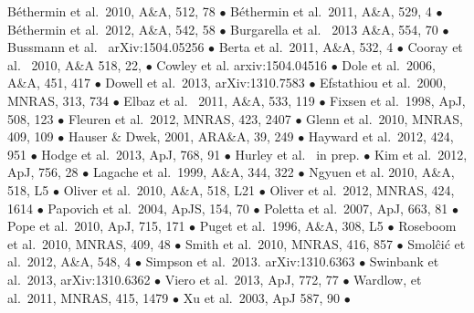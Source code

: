 \documentclass[12pt,a4paper]{article}
\begin{document}
B\'ethermin et al.\ 2010, A\&A, 512, 78 $\bullet$
B\'ethermin et al.\ 2011, A\&A, 529, 4 $\bullet$ 
B\'ethermin et al.\ 2012, A\&A, 542, 58 $\bullet$
Burgarella et al. \ 2013 A\&A, 554, 70 $\bullet$
Bussmann et al. \ arXiv:1504.05256 $\bullet$
Berta et al.\ 2011, A\&A, 532, 4 $\bullet$
Cooray et al. \ 2010, A\&A 518, 22, $\bullet$
Cowley et al. arxiv:1504.04516 $\bullet$
Dole et al.\ 2006, A\&A, 451, 417 $\bullet$
Dowell et al.\ 2013, arXiv:1310.7583 $\bullet$
Efstathiou et al.\ 2000, MNRAS, 313, 734 $\bullet$
Elbaz et al. \ 2011, A\&A, 533, 119 $\bullet$
Fixsen et al.\ 1998, ApJ, 508, 123 $\bullet$
Fleuren et al.\ 2012, MNRAS, 423, 2407 $\bullet$
Glenn et al.\ 2010, MNRAS, 409, 109 $\bullet$
Hauser \& Dwek, 2001, ARA\&A, 39, 249 $\bullet$
Hayward et al.\ 2012, 424, 951 $\bullet$
Hodge et al.\ 2013, ApJ, 768, 91 $\bullet$
Hurley et al. \ in prep. $\bullet$
Kim et al.\ 2012, ApJ, 756, 28 $\bullet$
Lagache et al.\ 1999, A\&A, 344, 322 $\bullet$
Ngyuen et al. 2010, A\&A, 518, L5 $\bullet$
Oliver et al.\ 2010, A\&A, 518, L21 $\bullet$
Oliver et al.\ 2012, MNRAS, 424, 1614 $\bullet$
Papovich et al.\ 2004, ApJS, 154, 70 $\bullet$
Poletta et al.\ 2007, ApJ, 663, 81 $\bullet$
Pope et al.\ 2010, ApJ, 715, 171 $\bullet$
Puget et al.\ 1996, A\&A, 308, L5 $\bullet$
Roseboom et al.\ 2010, MNRAS, 409, 48 $\bullet$
Smith et al.\ 2010, MNRAS, 416, 857 $\bullet$
Smol\^ci\'c et al.\ 2012, A\&A, 548, 4 $\bullet$
Simpson et al.\ 2013. arXiv:1310.6363 $\bullet$
Swinbank et al.\ 2013, arXiv:1310.6362 $\bullet$
Viero et al.\ 2013, ApJ, 772, 77 $\bullet$
Wardlow, et al.\ 2011, MNRAS, 415, 1479 $\bullet$
Xu et al.\ 2003, ApJ 587, 90 $\bullet$



\end{document}
